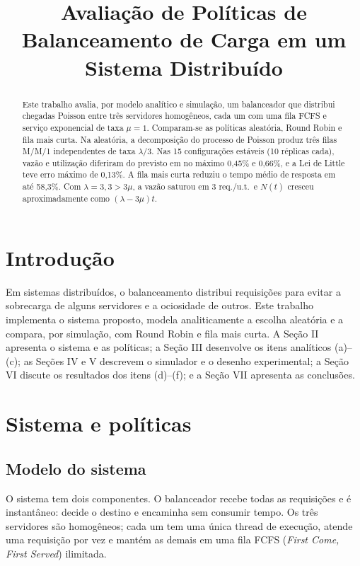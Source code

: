 \documentclass[conference,a4paper]{IEEEtran}
\title{Avaliação de Políticas de Balanceamento de Carga em um Sistema Distribuído}
\author{%
  \IEEEauthorblockN{Caique Pinheiro Andrade e Luiz Henrique Marques Gonçalves}
  \IEEEauthorblockA{Instituto de Computação -- Universidade Estadual de Campinas\\
  MC714 -- Sistemas Distribuídos -- 2º semestre de 2026\\
  \texttt{c204677@dac.unicamp.br, l183218@dac.unicamp.br}}
}
\begin{document}
\maketitle

\begin{abstract}
Este trabalho avalia, por modelo analítico e simulação, um balanceador que
distribui chegadas Poisson entre três servidores homogêneos, cada um com uma
fila FCFS e serviço exponencial de taxa $\mu=1$. Comparam-se as políticas
aleatória, Round Robin e fila mais curta. Na aleatória, a decomposição do
processo de Poisson produz três filas M/M/1 independentes de taxa
$\lambda/3$. Nas 15 configurações estáveis (10 réplicas cada), vazão e
utilização diferiram do previsto em no máximo 0,45\% e 0,66\%, e a Lei de
Little teve erro máximo de 0,13\%. A fila mais curta reduziu o tempo médio de
resposta em até 58,3\%. Com $\lambda=3{,}3>3\mu$, a vazão saturou em
3 req./u.t.\ e $N(t)$ cresceu aproximadamente como $(\lambda-3\mu)t$.
\end{abstract}

\section{Introdução}

Em sistemas distribuídos, o balanceamento distribui requisições para evitar
a sobrecarga de alguns servidores e a ociosidade de outros. Este trabalho
implementa o sistema proposto, modela analiticamente a escolha aleatória e a
compara, por simulação, com Round Robin e fila mais curta. A Seção II apresenta o sistema e as
políticas; a Seção III desenvolve os itens analíticos (a)--(c); as Seções IV
e V descrevem o simulador e o desenho experimental; a Seção VI discute os
resultados dos itens (d)--(f); e a Seção VII apresenta as conclusões.

\section{Sistema e políticas}

\subsection{Modelo do sistema}

O sistema tem dois componentes. O balanceador recebe todas as requisições e
é instantâneo: decide o destino e encaminha sem consumir tempo. Os três
servidores são homogêneos; cada um tem uma única
thread de execução, atende uma requisição por vez e mantém as demais em uma
fila FCFS (\emph{First Come, First Served}) ilimitada.
\end{document}

